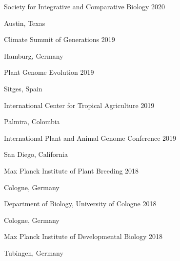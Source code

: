 \documentclass[12pt,english]{article}
\begin{document}
\hspace*{1.0em}Society for Integrative and Comparative Biology \hfill 2020 \par
\hspace*{2.0em}Austin, Texas \par\vspace{0.5ex}

\hspace*{1.0em}Climate Summit of Generations \hfill 2019 \par
\hspace*{2.0em}Hamburg, Germany \par\vspace{0.5ex}

\hspace*{1.0em}Plant Genome Evolution \hfill 2019 \par
\hspace*{2.0em}Sitges, Spain \par\vspace{0.5ex}

\hspace*{1.0em}International Center for Tropical Agriculture  \hfill 2019 \par
\hspace*{2.0em}Palmira, Colombia \par\vspace{0.5ex}

\hspace*{1.0em}International Plant and Animal Genome Conference  \hfill 2019 \par
\hspace*{2.0em}San Diego, California \par\vspace{0.5ex}

\hspace*{1.0em}Max Planck Institute of Plant Breeding  \hfill 2018 \par
\hspace*{2.0em}Cologne, Germany \par\vspace{0.5ex}

\hspace*{1.0em}Department of Biology, University of Cologne  \hfill 2018 \par
\hspace*{2.0em}Cologne, Germany \par\vspace{0.5ex}

\hspace*{1.0em}Max Planck Institute of Developmental Biology  \hfill 2018 \par
\hspace*{2.0em}Tubingen, Germany  \par\vspace{0.5ex}
\end{document}
